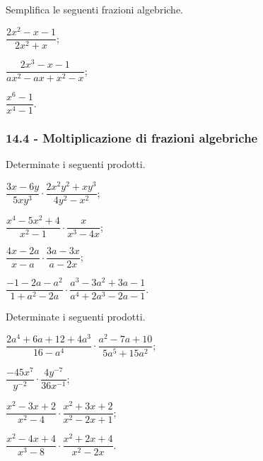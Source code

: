 \begin{esercizio}[\Ast]
\label{ese:14.11}
Semplifica le seguenti frazioni algebriche.
\begin{multicols}{3}
\begin{enumeratea}
 \item $\dfrac{2x^{2}-x-1}{2x^{2}+x}$;
 \item $\dfrac{2x^{3}-x-1}{ax^{2}-ax+x^{2}-x}$;
 \item $\dfrac{x^{6}-1}{x^{4}-1}$.
\end{enumeratea}
\end{multicols}
\end{esercizio}

\subsubsection*{14.4 - Moltiplicazione di frazioni algebriche}

\begin{esercizio}[\Ast]
\label{ese:14.12}
Determinate i seguenti prodotti.
\begin{multicols}{2}
\begin{enumeratea}
 \item $\dfrac{3x-6y}{5xy^{3}}\cdot\dfrac{2x^{2}y^{2}+xy^{3}}{4y^{2}-x^{2}}$;
 \item $\dfrac{x^{4}-5x^{2}+4}{x^{2}-1}\cdot\dfrac{x}{x^{3}-4x}$;
 \item $\dfrac{4x-2a}{x-a}\cdot\dfrac{3a-3x}{a-2x}$;
 \item $\dfrac{-1-2a-a^{2}}{1+a^{2}-2a}\cdot\dfrac{a^{3}-3a^{2}+3a-1}{a^{4}+2a^{3}-2a-1}$.
\end{enumeratea}
\end{multicols}
\end{esercizio}

\begin{esercizio}[\Ast]
\label{ese:14.13}
Determinate i seguenti prodotti.
\begin{multicols}{2}
\begin{enumeratea}
 \item $\dfrac{2a^{4}+6a+12+4a^{3}}{16-a^{4}}\cdot\dfrac{a^{2}-7a+10}{5a^{5}+15a^{2}}$;
 \item $\dfrac{-45x^{7}}{y^{-2}}\cdot\dfrac{4y^{-7}}{36x^{-1}}$;
 \item $\dfrac{x^{2}-3x+2}{x^{2}-4}\cdot\dfrac{x^{2}+3x+2}{x^{2}-2x+1}$;
 \item $\dfrac{x^{2}-4x+4}{x^{3}-8}\cdot\dfrac{x^{2}+2x+4}{x^{2}-2x}$.
\end{enumeratea}
\end{multicols}
\end{esercizio}

